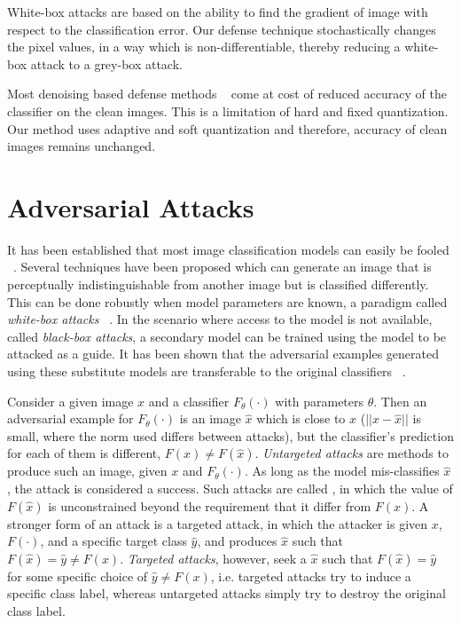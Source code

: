 White-box attacks are based on the ability to find the gradient of image with respect to the classification error. 
Our defense technique stochastically changes the pixel values, in a way which is non-differentiable, thereby reducing a white-box attack to a grey-box attack.

Most denoising based defense methods ~\cite{Dziugaite2016ASO,Das2017KeepingTB} come at cost of reduced accuracy of the classifier on the clean images.
This is a limitation of hard and fixed quantization. 
Our method uses adaptive and soft quantization and therefore, accuracy of clean images remains unchanged.





\section{Adversarial Attacks\label{sec:advattacks}}
It has been established that most image classification models can easily be fooled ~\cite{Szegedy2013IntriguingPO,Goodfellow2014ExplainingAH}. 
Several techniques have been proposed which can generate an image that is perceptually indistinguishable from another image but is classified differently. 
This can be done robustly when model parameters are known, a paradigm called \textit{white-box attacks} ~\cite{Goodfellow2014ExplainingAH,Kurakin2016AdversarialEI,Madry2017TowardsDL,Carlini2017TowardsET}.
In the scenario where access to the model is not available, called \textit{black-box attacks}, a secondary model can be trained using the model to be attacked as a guide.
It has been shown that the adversarial examples generated using these substitute models are transferable to the original classifiers ~\cite{Papernot2016PracticalBA,Liu2016DelvingIT}.

Consider a given image $x$ and a classifier $F_\theta(\cdot)$ with parameters $\theta$.
Then an adversarial example for $F_\theta(\cdot)$ is an image $\hat{x}$ which is close
to $x$ (\ie $||x-\hat{x}||$ is small, where the norm used differs between attacks),  but the classifier's prediction for each of them is different, \ie $F(x) \neq F(\hat{x})$. 
\textit{Untargeted attacks} are  methods to produce such an image, given $x$ and $F_\theta(\cdot)$. 
As long as the model mis-classifies $\hat{x}$, the attack is considered a success.
Such attacks are called , in which the value of $F(\hat{x})$ is unconstrained beyond the requirement that it differ from $F(x)$.
A stronger form of an attack is a {targeted attack}, in which the attacker is given $x$, $F(\cdot)$, and a specific target class $\hat{y}$, and produces $\hat{x}$ such that $F(\hat{x}) = \hat{y} \neq F(x)$.
\emph{Targeted attacks}, however, seek a $\hat{x}$ such that $F(\hat{x}) = \hat{y}$ for some specific choice of $\hat{y} \neq F(x)$, i.e. targeted attacks try to induce a specific class label, whereas untargeted attacks simply try to destroy the original class label.

